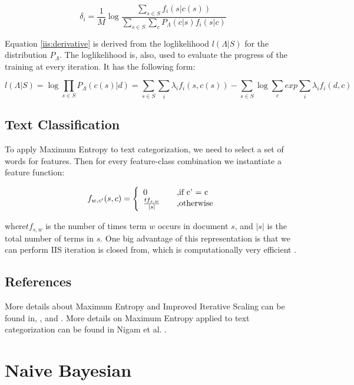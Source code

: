 \documentclass{report}
\begin{document}
\begin{equation}
\label{iis:delta}
\delta_i  = \frac{1}{M} \log \frac{\sum_{s \in S} f_i (s|c(s))}{\sum_{s \in S}\sum_{c} P_{\Lambda}(c|s) f_i(s|c) }
\end{equation}

Equation \ref{iis:derivative} is derived from the loglikelihood $l(\Lambda|S)$ for the distribution $P_{\Lambda}$. The loglikelihood is, also, used to evaluate the progress of the training at every iteration. It has the following form:

\[
l(\Lambda|S) = \log \prod_{s \in S} P_{\Lambda}(c(s)|d) = \sum_{s \in S} \sum_{i} \lambda_i f_i(s, c(s)) - \sum_{s \in S} \log \sum_{c} exp \sum_{i} \lambda_i f_i(d,c)
\]

\subsection{Text Classification}

To apply Maximum Entropy to text categorization, we need to select a set of words for features. Then for every feature-class combination we instantiate a feature function:

\[
f_{w,c'}(s,c) =  \left\{ 
  \begin{array}{l l}
    0 & \quad \text{,if c' = c}\\
    \frac{tf_{s,w}}{|s|} & \quad \text{,otherwise}\\
  \end{array} \right.
\]

where$ tf_{s,w}$ is the number of times term $w$ occurs in document $s$, and $|s|$ is the total number of terms in $s$.
One big advantage of this representation is that we can perform IIS iteration is closed from, which is computationally very efficient \cite{oai:CiteSeerPSU:93050}.

\subsection{References}

More details about Maximum Entropy and Improved Iterative Scaling can be found in\cite{berger_a1-etal:1996a}, \cite{berger:gental}, \cite{manning99} and \cite{oai:CiteSeerPSU:93050}. More details on Maximum Entropy applied to text categorization can be found in Nigam et al. \cite{oai:CiteSeerPSU:93050}.

\section{Naive Bayesian}
\end{document}

